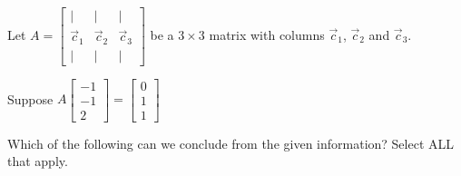 \documentclass{ximera}
\begin{document}
\begin{exercise}
Let $A=\begin{bmatrix}|&|&|\\\vec{c}_1& \vec{c}_2 & \vec{c}_3\\|&|&|\end{bmatrix}$ be a $3\times 3$ matrix with columns $\vec{c}_1$, $\vec{c}_2$ and $\vec{c}_3$.
 
Suppose $A\begin{bmatrix}-1\\-1\\2\end{bmatrix}=\begin{bmatrix}0\\1\\1\end{bmatrix}$
 
Which of the following can we conclude from the given information?  Select ALL that apply.
\begin{selectAll}
  \end{selectAll}
\end{exercise}
\end{document}
